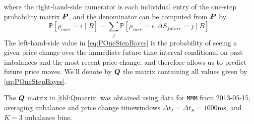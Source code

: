 where the right-hand-side numerator is each individual entry of the one-step probability matrix $\boldsymbol{P}$, and the denominator can be computed from $\boldsymbol{P}$ by
\begin{equation}\label{eq:POneStepBayesDenom}
\mathbb{P}\left[ \rho_{curr} = i \; | \; B \right] = \sum\limits_j \mathbb{P}\left[ \rho_{curr} = i,  \Delta S_{future} = j \; | \; B \right]
\end{equation}
The left-hand-side value in \eqref{eq:POneStepBayes} is the probability of seeing a given price change over the immediate future time interval conditional on past imbalances and the most recent price change, and therefore allows us to predict future price moves. We'll denote by $\boldsymbol{Q}$ the matrix containing all values given by \eqref{eq:POneStepBayes}.

The $\boldsymbol{Q}$ matrix in \autoref{tbl:Qmatrix} was obtained using data for \texttt{MMM} from 2013-05-15, averaging imbalance and price change timewindows $\Delta t_I = \Delta t_S = 1000\text{ms}$, and $K=3$ imbalance bins.
